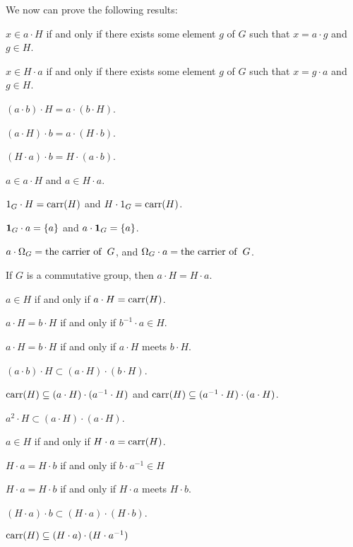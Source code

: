 \documentclass{article}
\begin{document}
We now can prove the following results:
\begin{thm}
\item\label{group2:103} $x\in a\cdot H$ if and only if there exists some
  element $g$ of $G$ such that $x=a\cdot g$ and $g\in H$.
\item\label{group2:104} $x\in H\cdot a$ if and only if there exists some
  element $g$ of $G$ such that $x=g\cdot a$ and $g\in H$.
\item\label{group2:105} $(a\cdot b)\cdot H=a\cdot(b\cdot H)$.
\item\label{group2:106} $(a\cdot H)\cdot b=a\cdot(H\cdot b)$.
\item\label{group2:107} $(H\cdot a)\cdot b=H\cdot(a\cdot b)$.
\item\label{group2:108} $a\in a\cdot H$ and $a\in H\cdot a$.
\item\label{group2:109} $1_{G}\cdot H=\operatorname{carr}(H)$ and $H\cdot1_{G}=\operatorname{carr}(H)$.
\item\label{group2:110} $\mathbf{1}_{G}\cdot a=\{a\}$ and $a\cdot\mathbf{1}_{G}=\{a\}$.
\item\label{group2:111} $a\cdot\Omega_{G}=\operatorname{the\ carrier\ of\ }G$, and
  $\Omega_{G}\cdot a=\operatorname{the\ carrier\ of\ }G$.
\item\label{group2:112} If $G$ is a commutative group, then $a\cdot H=H\cdot a$.
\item\label{group2:113} $a\in H$ if and only if $a\cdot H=\operatorname{carr}(H)$.
\item\label{group2:114} $a\cdot H=b\cdot H$ if and only if $b^{-1}\cdot a\in H$.
\item\label{group2:115} $a\cdot H=b\cdot H$ if and only if $a\cdot H$
  meets $b\cdot H$.
\item\label{group2:116} $(a\cdot b)\cdot H\subset(a\cdot H)\cdot(b\cdot H)$.
\item\label{group2:117} $\operatorname{carr}(H)\subseteq(a\cdot H)\cdot(a^{-1}\cdot H)$
  and $\operatorname{carr}(H)\subseteq(a^{-1}\cdot H)\cdot(a\cdot H)$.
\item\label{group2:118} $a^{2}\cdot H\subset(a\cdot H)\cdot(a\cdot H)$.
\item\label{group2:119} $a\in H$ if and only if $H\cdot a=\operatorname{carr}(H)$.
\item\label{group2:120} $H\cdot a=H\cdot b$ if and only if $b\cdot a^{-1}\in H$
\item\label{group2:121} $H\cdot a=H\cdot b$ if and only if $H\cdot a$
  meets $H\cdot b$.
\item\label{group2:122} $(H\cdot a)\cdot b\subset (H\cdot a)\cdot(H\cdot b)$.
\item\label{group2:123} $\operatorname{carr}(H)\subseteq(H\cdot a)\cdot(H\cdot a^{-1})$

\end{thm}
\end{document}
